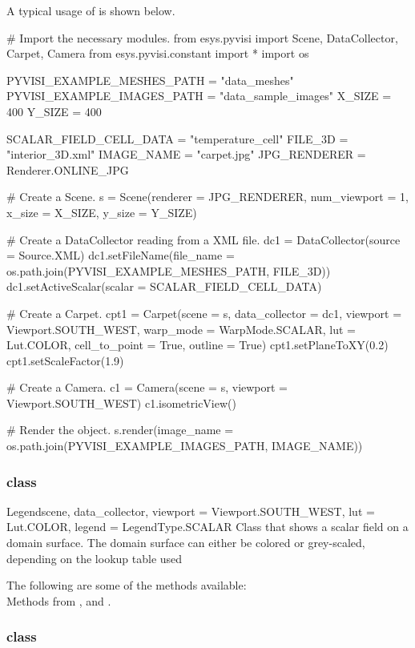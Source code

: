 A typical usage of \Carpet is shown below.

\begin{python}
# Import the necessary modules.
from esys.pyvisi import Scene, DataCollector, Carpet, Camera
from esys.pyvisi.constant import *
import os

PYVISI_EXAMPLE_MESHES_PATH = "data_meshes"
PYVISI_EXAMPLE_IMAGES_PATH = "data_sample_images"
X_SIZE = 400
Y_SIZE = 400

SCALAR_FIELD_CELL_DATA = "temperature_cell"
FILE_3D = "interior_3D.xml"
IMAGE_NAME = "carpet.jpg"
JPG_RENDERER = Renderer.ONLINE_JPG

# Create a Scene.
s = Scene(renderer = JPG_RENDERER, num_viewport = 1, x_size = X_SIZE, 
        y_size = Y_SIZE)

# Create a DataCollector reading from a XML file.
dc1 = DataCollector(source = Source.XML)
dc1.setFileName(file_name = os.path.join(PYVISI_EXAMPLE_MESHES_PATH, FILE_3D))
dc1.setActiveScalar(scalar = SCALAR_FIELD_CELL_DATA)

# Create a Carpet.
cpt1 = Carpet(scene = s, data_collector = dc1, viewport = Viewport.SOUTH_WEST, 
        warp_mode = WarpMode.SCALAR, lut = Lut.COLOR, cell_to_point = True,
        outline = True)
cpt1.setPlaneToXY(0.2)
cpt1.setScaleFactor(1.9)

# Create a Camera.
c1 = Camera(scene = s, viewport = Viewport.SOUTH_WEST)
c1.isometricView()

# Render the object.
s.render(image_name = os.path.join(PYVISI_EXAMPLE_IMAGES_PATH, IMAGE_NAME))
\end{python}

\subsubsection{\Legend class}

\begin{classdesc}{Legend}{scene, data_collector, 
viewport = Viewport.SOUTH_WEST, lut = Lut.COLOR, legend = LegendType.SCALAR}
Class that shows a scalar field on a domain surface. The domain surface
can either be colored or grey-scaled, depending on the lookup table used
\end{classdesc}

The following are some of the methods available:\\
Methods from \ActorThreeD, \ScalarBar and \DataSetMapper.

\subsubsection{\Image class}

